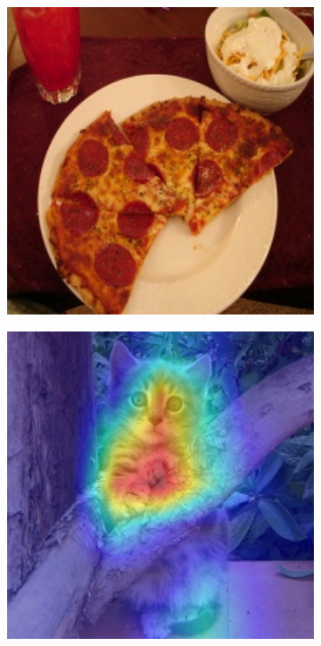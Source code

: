 \begin{figure}[t]
\begin{subfigure}[b]{0.19\textwidth}
        \includegraphics[width=1\textwidth]{figures/qualitative_results/ILSVRC2012_val_00018461_resize.JPEG}
    \end{subfigure}    
    \begin{subfigure}[b]{0.19\textwidth}
        \centering
        \includegraphics[width=1\textwidth]{figures/qualitative_results/ILSVRC2012_val_00023779_resnet50.JPEG}

\end{subfigure}
\end{figure}
